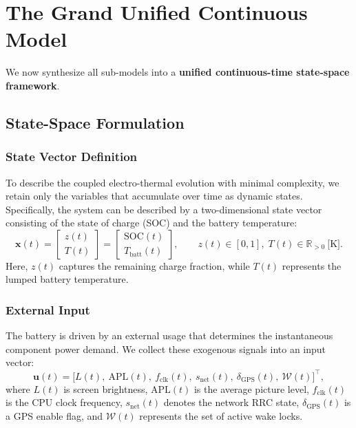 \documentclass{mcmthesis}
\begin{document}
\begin{figure}[htbp]
\begin{tikzpicture}
\end{tikzpicture}

\end{figure}

\section{The Grand Unified Continuous Model}                           
\label{sec:grand_unified}                                  
We now synthesize all sub-models into a \textbf{unified continuous-time state-space framework}.                   
\subsection{State-Space Formulation}

\subsubsection{State Vector Definition}

To describe the coupled electro-thermal evolution with minimal complexity, we retain only the variables that accumulate over time as dynamic states. Specifically, the system can be described by a two-dimensional state vector consisting of the state of charge (SOC) and the battery temperature:
\begin{equation}
\mathbf{x}(t)=
\begin{bmatrix}
z(t)\\
T(t)
\end{bmatrix}
=
\begin{bmatrix}
\mathrm{SOC}(t)\\
T_{\mathrm{batt}}(t)
\end{bmatrix},
\qquad
z(t)\in[0,1],\; T(t)\in\mathbb{R}_{>0}\ \text{[K]}.
\label{eq:state_vector_unified}
\end{equation}
Here, $z(t)$ captures the remaining charge fraction, while $T(t)$ represents the lumped battery temperature.

\subsubsection{External Input}

The battery is driven by an external usage that determines the instantaneous component power demand. We collect these exogenous signals into an input vector:
\begin{equation}
\mathbf{u}(t)=
\bigl[
L(t),\ \mathrm{APL}(t),\ f_{\mathrm{clk}}(t),\ s_{\mathrm{net}}(t),\ \delta_{\mathrm{GPS}}(t),\ \mathcal{W}(t)
\bigr]^\top,
\label{eq:input_vector_unified}
\end{equation}
where $L(t)$ is screen brightness, $\mathrm{APL}(t)$ is the average picture level, $f_{\mathrm{clk}}(t)$ is the CPU clock frequency, $s_{\mathrm{net}}(t)$ denotes the network RRC state, $\delta_{\mathrm{GPS}}(t)$ is a GPS enable flag, and $\mathcal{W}(t)$ represents the set of active wake locks.
\end{document}
